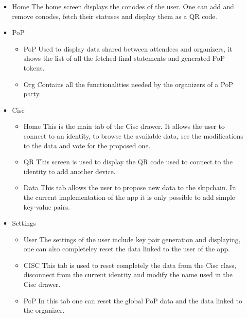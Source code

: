 \begin{itemize}
\item Home \linebreak The home screen displays the conodes of the user. One can add and remove conodes, fetch their statuses and display them as a QR code.

\item PoP
\begin{itemize}
\item PoP \linebreak Used to display data shared between attendees and organizers, it shows the list of all the fetched final statements and generated PoP tokens.

\item Org \linebreak Contains all the functionalities needed by the organizers of a PoP party.
\end{itemize}

\item Cisc
\begin{itemize}
\item Home \linebreak This is the main tab of the Cisc drawer. It allows the user to connect to an identity, to browse the available data, see the modifications to the data and vote for the proposed one.

\item QR \linebreak This screen is used to display the QR code used to connect to the identity to add another device.

\item Data \linebreak This tab allows the user to propose new data to the skipchain. In the current implementation of the app it is only possible to add simple key-value pairs.
\end{itemize}

\item Settings
\begin{itemize}
\item User \linebreak The settings of the user include key pair generation and displaying, one can also completeley reset the data linked to the user of the app.

\item CISC \linebreak This tab is used to reset completely the data from the Cisc class, disconnect from the current identity and modify the name used in the Cisc drawer.

\item PoP \linebreak In this tab one can reset the global PoP data and the data linked to the organizer.
\end{itemize}
\end{itemize}

